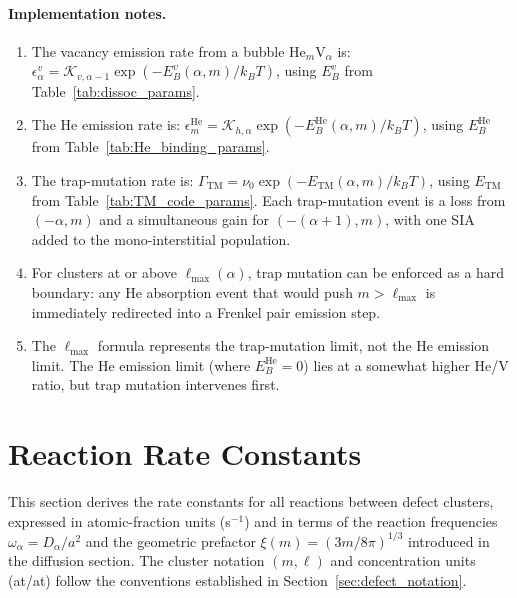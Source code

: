 \documentclass[pdflatex,sn-basic]{sn-jnl} %
\begin{document}
\paragraph{Implementation notes.}
\begin{enumerate}
    \item The vacancy emission rate from a bubble He$_m$V$_\alpha$ is:
    $\epsilon_\alpha^v = \mathcal{K}_{v,\alpha-1}\exp(-E_B^v(\alpha,m)/k_BT)$,
    using $E_B^v$ from Table~\ref{tab:dissoc_params}.
    
    \item The He emission rate is:
    $\epsilon_m^{\mathrm{He}} = \mathcal{K}_{h,\alpha}\exp(-E_B^{\mathrm{He}}(\alpha,m)/k_BT)$,
    using $E_B^{\mathrm{He}}$ from Table~\ref{tab:He_binding_params}.
    
    \item The trap-mutation rate is:
    $\Gamma_{\mathrm{TM}} = \nu_0\exp(-E_{\mathrm{TM}}(\alpha,m)/k_BT)$,
    using $E_{\mathrm{TM}}$ from Table~\ref{tab:TM_code_params}.
    Each trap-mutation event is a loss from $(-\alpha, m)$ and a simultaneous
    gain for $(-(\alpha+1), m)$, with one SIA added to the mono-interstitial
    population.
    
    \item For clusters at or above $\ell_{\max}(\alpha)$, trap mutation can be
    enforced as a hard boundary: any He absorption event that would push $m >
    \ell_{\max}$ is immediately redirected into a Frenkel pair emission step.
    
    \item The $\ell_{\max}$ formula represents the trap-mutation limit, not
    the He emission limit. The He emission limit (where $E_B^{\mathrm{He}} =
    0$) lies at a somewhat higher He/V ratio, but trap mutation intervenes
    first.
\end{enumerate}
\section{Reaction Rate Constants}
\label{sec:reaction_rates}

This section derives the rate constants for all reactions between defect
clusters, expressed in atomic-fraction units (s$^{-1}$) and in terms of the
reaction frequencies $\omega_\alpha = D_\alpha/a^2$ and the geometric prefactor
$\xi(m) = (3m/8\pi)^{1/3}$ introduced in the diffusion section. The cluster
notation $(m,\ell)$ and concentration units (at/at) follow the conventions
established in Section~\ref{sec:defect_notation}.
\end{document}
